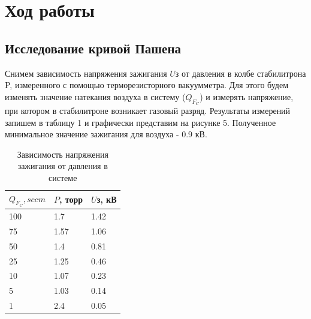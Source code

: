 \documentclass[a4paper]{article}
\begin{document}
\section{Ход работы}

\subsection{Исследование кривой Пашена}

Снимем зависимость напряжения зажигания $U$з от давления в колбе стабилитрона P, измеренного с помощью терморезисторного вакуумметра. Для этого будем изменять значение натекания воздуха в систему ($Q_F_C$) и измерять напряжение, при котором в стабилитроне возникает газовый разряд. Результаты измерений запишем в таблицу 1 и графически представим на рисунке 5. Полученное минимальное значение зажигания для воздуха - 0.9 кВ. 

\begin{table}[h]
    \centering
    \begin{center}
    \caption{Зависимость напряжения зажигания от давления в системе}
        \label{tab:my_label}
    \end{center}
   \begin{tabular}{ |p{2cm}|p{2cm}|p{2cm}|  }

 \hline
 $Q_F_C, sccm$ & $P$, торр & $U$з, кВ   \\
\hline
\hline

100 & 1.7 & 1.42 \\
\hline
75 & 1.57 & 1.06 \\
\hline
50 & 1.4 & 0.81 \\
\hline
25 & 1.25 & 0.46 \\
\hline
10 & 1.07 & 0.23 \\
\hline
5 & 1.03 & 0.14 \\
\hline
1 & 2.4 & 0.05 \\
 \hline
\end{tabular}

\end{table}
\end{document}
